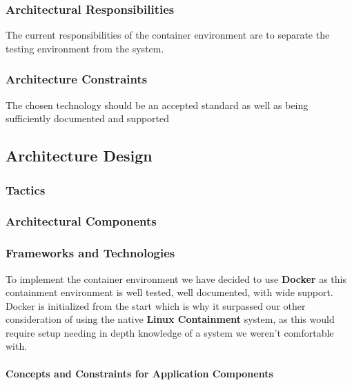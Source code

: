\subsubsection{Architectural Responsibilities}
The current responsibilities of the container environment are to separate the
testing environment from the system. 

\subsubsection{Architecture Constraints}
The chosen technology should be an accepted standard as well as being sufficiently
documented and supported

\subsection{Architecture Design}
\subsubsection{Tactics}

\subsubsection{Architectural Components}

\subsubsection{Frameworks and Technologies}
To implement the container environment we have decided to use \textbf{Docker} as
this containment environment is well tested, well documented, with wide support.
Docker is initialized from the start which is why it surpassed our other consideration
of using the native \textbf{Linux Containment} system, as this would require setup
needing in depth knowledge of a system we weren't comfortable with.

\paragraph{Concepts and Constraints for Application Components}
